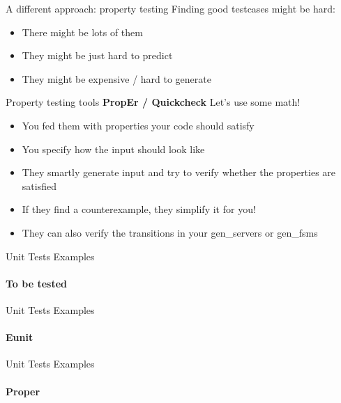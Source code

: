 \documentclass[]{beamer}
\begin{document}
\begin{frame}{A different approach: property testing}
    Finding good testcases might be hard:
    \begin{itemize}
    \item There might be lots of them
    \pause
    \item They might be just hard to predict
    \pause
    \item They might be expensive / hard to generate
    \end{itemize}
\end{frame}

\begin{frame}{Property testing tools}
    \textbf{PropEr / Quickcheck} Let's use some math!
    \begin{itemize}
    \pause
    \item You fed them with properties your code should satisfy
    \pause
    \item You specify how the input should look like
    \pause
    \item They smartly generate input and try to verify whether the properties are satisfied
    \pause
    \item If they find a counterexample, they simplify it for you!
    \pause
    \item They can also verify the transitions in your gen\_servers or gen\_fsms
    \end{itemize}
\end{frame}

\begin{frame}{Unit Tests Examples}
    \framesubtitle{To be tested}
    
\end{frame}

\begin{frame}{Unit Tests Examples}
    \framesubtitle{Eunit}
    
\end{frame}

\begin{frame}{Unit Tests Examples}
    \framesubtitle{Proper}
    
\end{frame}
\end{document}
